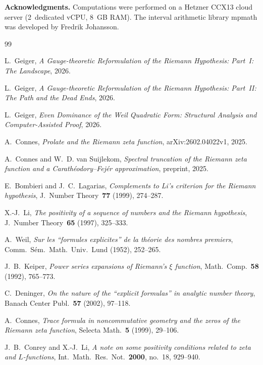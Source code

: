 \documentclass[12pt,a4paper]{article}
\theoremstyle{definition}
\theoremstyle{remark}
\begin{document}
\bigskip
\noindent\textbf{Acknowledgments.} Computations were performed on a Hetzner CCX13 cloud server (2~dedicated vCPU, 8~GB RAM). The interval arithmetic library mpmath was developed by Fredrik Johansson.


\begin{thebibliography}{99}

L.~Geiger, \emph{A Gauge-theoretic Reformulation of the Riemann Hypothesis: Part~I: The Landscape}, 2026.

L.~Geiger, \emph{A Gauge-theoretic Reformulation of the Riemann Hypothesis: Part~II: The Path and the Dead Ends}, 2026.

L.~Geiger, \emph{Even Dominance of the Weil Quadratic Form: Structural Analysis and Computer-Assisted Proof}, 2026.

A.~Connes, \emph{Prolate and the Riemann zeta function}, arXiv:2602.04022v1, 2025.

A.~Connes and W.~D. van Suijlekom, \emph{Spectral truncation of the Riemann zeta function and a Carath\'eodory--Fej\'er approximation}, preprint, 2025.

E.~Bombieri and J.~C.~Lagarias, \emph{Complements to Li's criterion for the Riemann hypothesis}, J.~Number Theory~\textbf{77} (1999), 274--287.

X.-J.~Li, \emph{The positivity of a sequence of numbers and the Riemann hypothesis}, J.~Number Theory~\textbf{65} (1997), 325--333.

A.~Weil, \emph{Sur les ``formules explicites'' de la th\'eorie des nombres premiers}, Comm.~S\'em.~Math.~Univ.~Lund (1952), 252--265.

J.~B.~Keiper, \emph{Power series expansions of Riemann's $\xi$ function}, Math.~Comp.~\textbf{58} (1992), 765--773.

C.~Deninger, \emph{On the nature of the ``explicit formulas'' in analytic number theory}, Banach Center Publ.~\textbf{57} (2002), 97--118.

A.~Connes, \emph{Trace formula in noncommutative geometry and the zeros of the Riemann zeta function}, Selecta Math.~\textbf{5} (1999), 29--106.

J.~B.~Conrey and X.-J.~Li, \emph{A note on some positivity conditions related to zeta and $L$-functions}, Int.~Math.~Res.~Not.~\textbf{2000}, no.~18, 929--940.

\end{thebibliography}
\end{document}

